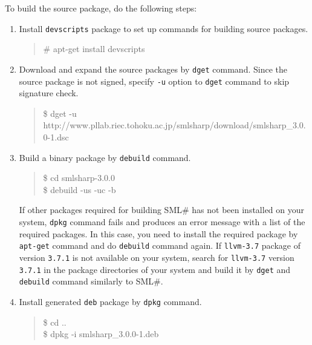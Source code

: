 \documentclass{jbook}
\newcommand{\smlsharp}{SML\#}
\newcommand{\version}{3.0.0}
\newenvironment{program}{\begin{quote}\begin{tt}}%
                        {\end{tt}\end{quote}}
\begin{document}
	To build the source package, do the following steps:
\begin{enumerate}
\item
	Install {\tt devscripts} package to set up commands for building
source packages.
\begin{program}
\# apt-get install devscripts
\end{program}
\item
	Download and expand the source packages by {\tt dget} command.
	Since the source package is not signed,
specify {\tt -u} option to {\tt dget} command to skip signature
check.
\begin{program}
\$ dget -u http://www.pllab.riec.tohoku.ac.jp/smlsharp/download/smlsharp\_\version-1.dsc
\end{program}
\item
	Build a binary package by {\tt debuild} command.
\begin{program}
\$ cd smlsharp-\version\\
\$ debuild -us -uc -b
\end{program}
	If other packages required for building \smlsharp{} has not been
installed on your system, {\tt dpkg} command fails and produces an error
message with a list of the required packages.
	In this case, you need to install the required package by
{\tt apt-get} command and do {\tt debuild} command again.
	If {\tt llvm-3.7} package of version {\tt 3.7.1} is not available
on your system,
search for {\tt llvm-3.7} version {\tt 3.7.1} in the package directories
of your system and build it by {\tt dget} and {\tt debuild} command
similarly to \smlsharp{}.
\item
	Install generated {\tt deb} package by {\tt dpkg} command.
\begin{program}
\$ cd ..\\
\$ dpkg -i smlsharp\_\version-1.deb
\end{program}
\end{enumerate}

\fi%
\end{document}
